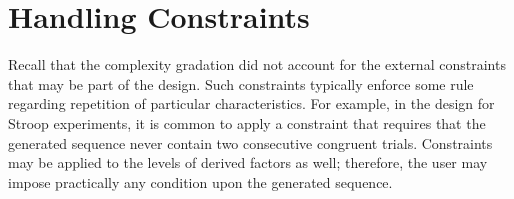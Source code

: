 





\section{Handling Constraints}

Recall that the complexity gradation did not account for the external constraints that may be part of the design. Such constraints typically enforce some rule regarding repetition of particular characteristics. For example, in the design for Stroop experiments, it is common to apply a constraint that requires that the generated sequence never contain two consecutive congruent trials. Constraints may be applied to the levels of derived factors as well; therefore, the user may impose practically any condition upon the generated sequence.

